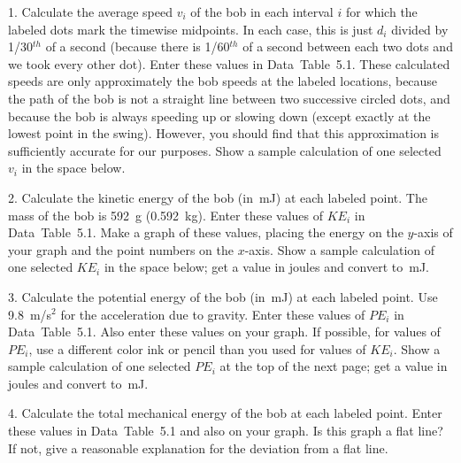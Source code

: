 \item{1.}  Calculate the average speed $v_i$ of the bob in each
interval $i$ for which the labeled dots mark the timewise 
midpoints.  In each case, this is just $d_i$ divided by 1/30$^{th}$ 
of a second (because there is 1/60$^{th}$ of a second between
each two dots and we took every other dot).  Enter these values 
in Data~Table~5.1.  These calculated speeds are only approximately 
the bob speeds at the labeled locations, because the path of the bob 
is not a straight line between two successive circled dots, and 
because the bob is always speeding up or slowing down (except 
exactly at the lowest point in the swing).  However, you should 
find that this approximation is sufficiently accurate for our 
purposes.  Show a sample calculation of one selected $v_i$ in
the space below.
\item{2.}  Calculate the kinetic energy of the bob (in~mJ) 
at each labeled point.  The mass of the bob is 592~g (0.592~kg).  
Enter these values of $KE_i$ in Data~Table~5.1.  Make a graph of 
these values, placing the energy on the $y$-axis of your graph 
and the point numbers on the $x$-axis.  Show a sample calculation
of one selected $KE_i$ in the space below; get a value in joules
and convert to~mJ.
\item{3.}  Calculate the potential energy of the bob (in~mJ)
at each labeled point.  Use 9.8~m/s$^2$ for the acceleration due
to gravity.  Enter these values of $PE_i$ in Data~Table~5.1.  
Also enter these values on your graph.  If possible, for values
of $PE_i$, use a different color ink or pencil than you used for
values of $KE_i$.  Show a sample calculation of one selected 
$PE_i$ at the top of the next page; get a value in joules and 
convert to~mJ.
\vfil\eject
\nopagenumbers
{} 
\item{4.} Calculate the total mechanical energy of the bob at
each labeled point.  Enter these values in Data~Table~5.1
and also on your graph.  Is this graph a flat line?  If not,
give a reasonable explanation for the deviation from a flat 
line.
{}

